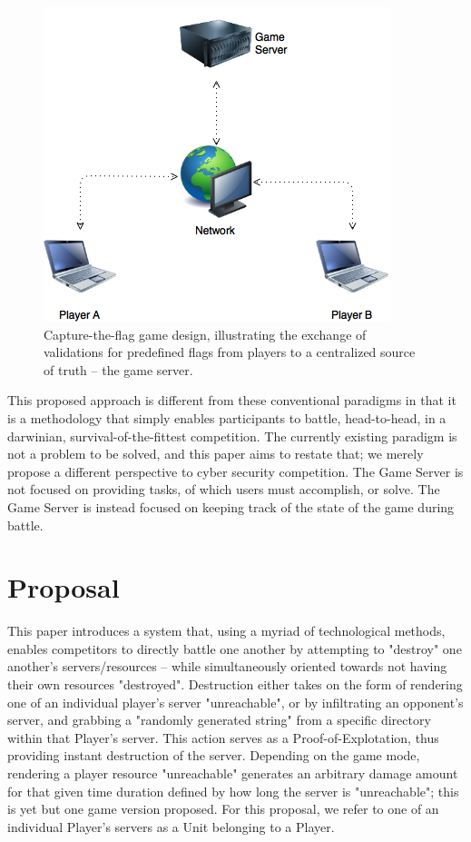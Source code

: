 \documentclass[10pt, titlepage, twocolumn]{article}
\begin{document}
\begin{figure}[ht]
\centering
	\includegraphics[width=.45\textwidth]{capturetheflag}
	\caption{Capture-the-flag game design, illustrating the exchange of validations for predefined flags from players to a centralized source of truth -- the game server.}
	\label{CTF}
\end{figure}

This proposed approach is different from these conventional paradigms in that it is a methodology that simply enables participants to battle, head-to-head,  in a darwinian, survival-of-the-fittest competition. The currently existing paradigm is not a problem to be solved, and this paper aims to restate that; we merely propose a different perspective to cyber security competition. The Game Server is not focused on providing tasks, of which users must accomplish, or solve. The Game Server is instead focused on keeping track of the state of the game during battle.

\section{Proposal}

This paper introduces a system that, using a myriad of technological methods, enables competitors to directly battle one another by attempting to "destroy" one another's servers/resources -- while simultaneously oriented towards not having their own resources "destroyed". Destruction either takes on the form of rendering one of an individual player's server "unreachable", or by infiltrating an opponent's server, and grabbing a "randomly generated string" from a specific directory within that Player's server. This action serves as a Proof-of-Explotation, thus providing instant destruction of the server. Depending on the game mode, rendering a player resource "unreachable" generates an arbitrary damage amount for that given time duration defined by how long the server is "unreachable"; this is yet but one game version proposed. For this proposal, we refer to one of an individual Player's servers as a Unit belonging to a Player.
\end{document}
